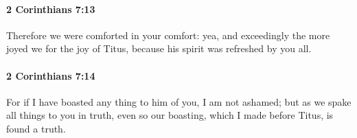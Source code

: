 		\paragraph{2 Corinthians 7:13} %
			\label{2CORINTHIANS-7-13}

			Therefore we were comforted in your comfort: yea, and exceedingly the more joyed we for the joy of Titus, because his spirit was refreshed by you all.

			\begin{framed}
			\scriptsize
				\begin{compactdesc}
					\item[SBLG] 
				\end{compactdesc}
			\end{framed}

		\paragraph{2 Corinthians 7:14} %
			\label{2CORINTHIANS-7-14}

			For if I have boasted any thing to him of you, I am not ashamed; but as we spake all things to you in truth, even so our boasting, which I made before Titus, is found a truth.


